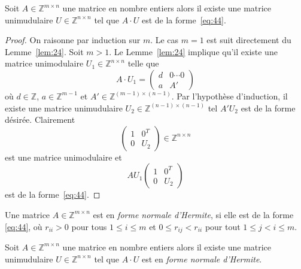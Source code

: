   \begin{corollary}
    \label{co:9}
    Soit  $A ∈ℤ^{ m ×n}$ une matrice en nombre entiers alors il  existe une matrice unimudulaire $U ∈ℤ^{ n ×n}$ tel que $A ⋅U$ est de la forme~\eqref{eq:44}.
  \end{corollary}
  \begin{proof}
    On raisonne par induction sur $m$. Le cas $m=1$ est suit directement du Lemme~\ref{lem:24}. Soit $m>1$. 
    Le Lemme~\ref{lem:24} implique qu'il existe une matrice unimodulaire $U_1 ∈ℤ^{n ×n}$ telle que
    \begin{displaymath}
      A ⋅ U_1 =
      \begin{pmatrix}
        d & 0 \cdots 0 \\
        a  & A'
      \end{pmatrix}
    \end{displaymath}
    où $d ∈ℤ$, $a ∈ ℤ^{m-1}$ et $A' ∈ ℤ^{(m-1) × (n-1)}$. Par l'hypothèse d'induction, il existe une matrice unimudulaire $U_2 ∈ℤ^{(n-1) ×(n-1)}$ tel $A' U_2$ est de la forme désirée. Clairement
      \begin{displaymath}
         \begin{pmatrix}
          1 & 0^T \\
          0 & U_2
        \end{pmatrix} ∈ℤ^{n ×n}
      \end{displaymath}
      est une matrice unimodulaire et 
      \begin{displaymath}
        A U_1
        \begin{pmatrix}
          1 & 0^T \\
          0 & U_2
        \end{pmatrix}
      \end{displaymath}
      est de la  forme~\eqref{eq:44}. 
  \end{proof}



  \begin{definition}
    \label{def:49}
    Une matrice $A ∈ℤ^{m ×n}$  est en \emph{forme normale d'Hermite}, si elle est de la forme \eqref{eq:44}, où $r_{ii}>0$ pour tous $1 ≤i≤ m$ et $0≤ r_{ij} < r_{ii}$ pour tout $1≤j<i≤m$. 
  \end{definition}
	
\begin{theorem}
  \label{thr:28}
    Soit  $A ∈ℤ^{ m ×n}$ une matrice en nombre entiers alors il  existe une matrice unimudulaire $U ∈ℤ^{ n ×n}$ tel que $A ⋅U$ est en \emph{forme normale d'Hermite}.
  \end{theorem}
  
